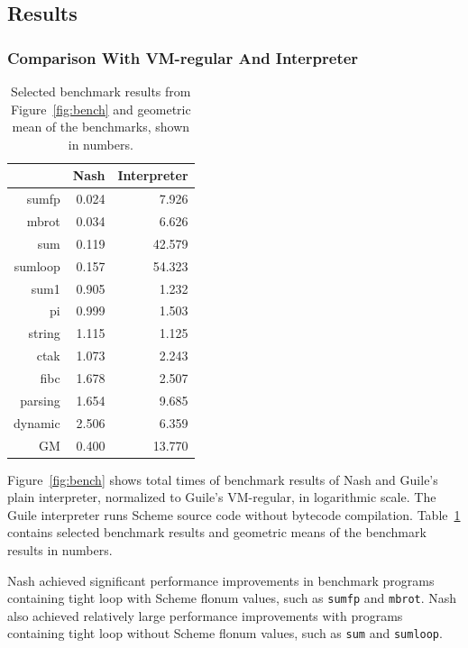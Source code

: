 \documentclass[preprint, 10pt]{sigplanconf}
\begin{document}
\subsection{Results}
\label{sec:results}

\subsubsection{Comparison With VM-regular And Interpreter}
\label{sec:guilecomp}

\begin{table}
  \centering
  \begin{tabular}{rrr}
     & Nash & Interpreter \\
    \toprule
    sumfp & 0.024 & 7.926 \\
    mbrot & 0.034 & 6.626 \\
    sum & 0.119 & 42.579 \\
    sumloop & 0.157 & 54.323 \\
    \midrule
    sum1 & 0.905 & 1.232 \\
    pi & 0.999 & 1.503 \\
    string & 1.115 & 1.125 \\
    \midrule
    ctak & 1.073 & 2.243 \\
    fibc & 1.678 & 2.507 \\
    parsing & 1.654 & 9.685 \\
    dynamic & 2.506 & 6.359 \\
    \midrule
    GM & 0.400 & 13.770 \\
  \end{tabular}
  \caption{Selected benchmark results from
    Figure~\hyperref[fig:bench]{\ref{fig:bench}} and geometric mean of the
    benchmarks, shown in numbers.}
\label{tab:compguile}
\end{table}

Figure~\ref{fig:bench} shows total times of benchmark results of Nash and
Guile's plain interpreter, normalized to Guile's VM-regular, in logarithmic
scale.  The Guile interpreter runs Scheme source code without bytecode
compilation.  Table~\hyperref[tab:compguile]{\ref{tab:compguile}} contains
selected benchmark results and geometric means of the benchmark results in
numbers.

Nash achieved significant performance improvements in benchmark programs
containing tight loop with Scheme flonum values, such as \texttt{sumfp} and
\texttt{mbrot}.  Nash also achieved relatively large performance improvements
with programs containing tight loop without Scheme flonum values, such as
\texttt{sum} and \texttt{sumloop}.
\end{document}
